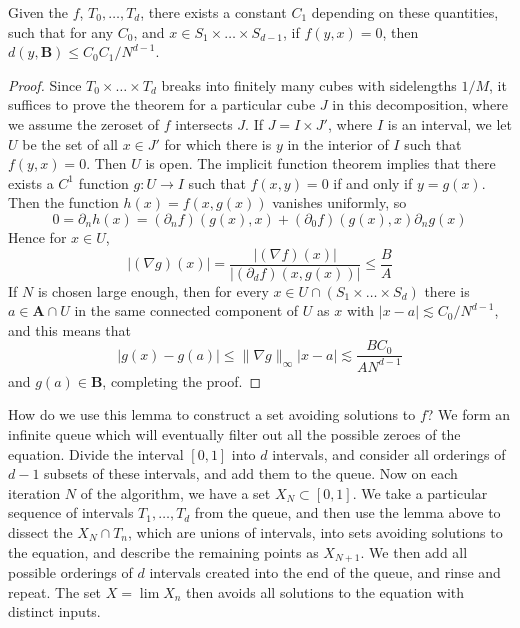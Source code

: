 \begin{lemma}
    Given the $f$, $T_0, \dots, T_d$, there exists a constant $C_1$ depending on these quantities, such that for any $C_0$, and $x \in S_1 \times \dots \times S_{d-1}$, if $f(y,x) = 0$, then $d(y, \mathbf{B}) \leq C_0C_1/N^{d-1}$.
\end{lemma}
\begin{proof}
    Since $T_0 \times \dots \times T_d$ breaks into finitely many cubes with sidelengths $1/M$, it suffices to prove the theorem for a particular cube $J$ in this decomposition, where we assume the zeroset of $f$ intersects $J$. If $J = I \times J'$, where $I$ is an interval, we let $U$ be the set of all $x \in J'$ for which there is $y$ in the interior of $I$ such that $f(y,x) = 0$. Then $U$ is open. The implicit function theorem implies that there exists a $C^1$ function $g: U \to I$ such that $f(x,y) = 0$ if and only if $y = g(x)$. Then the function $h(x) = f(x,g(x))$ vanishes uniformly, so
    \[ 0 = \partial_n h(x) = (\partial_n f) (g(x),x) + (\partial_0 f) (g(x),x) \partial_n g(x) \]
    Hence for $x \in U$,
    \[ |(\nabla g)(x)| = \frac{|(\nabla f)(x)|}{|(\partial_d f)(x,g(x))|} \leq \frac{B}{A} \]
    If $N$ is chosen large enough, then for every $x \in U \cap (S_1 \times \dots \times S_d)$ there is $a \in \mathbf{A} \cap U$ in the same connected component of $U$ as $x$ with $|x - a| \lesssim C_0/N^{d-1}$, and this means that
    \[ |g(x) - g(a)| \leq \| \nabla g \|_\infty |x - a| \lesssim \frac{BC_0}{A N^{d-1}} \]
    and $g(a) \in \mathbf{B}$, completing the proof.
\end{proof}

How do we use this lemma to construct a set avoiding solutions to $f$? We form an infinite queue which will eventually filter out all the possible zeroes of the equation. Divide the interval $[0,1]$ into $d$ intervals, and consider all orderings of $d - 1$ subsets of these intervals, and add them to the queue. Now on each iteration $N$ of the algorithm, we have a set $X_N \subset [0,1]$. We take a particular sequence of intervals $T_1, \dots, T_d$ from the queue, and then use the lemma above to dissect the $X_N \cap T_n$, which are unions of intervals, into sets avoiding solutions to the equation, and describe the remaining points as $X_{N+1}$. We then add all possible orderings of $d$ intervals created into the end of the queue, and rinse and repeat. The set $X = \lim X_n$ then avoids all solutions to the equation with distinct inputs.


